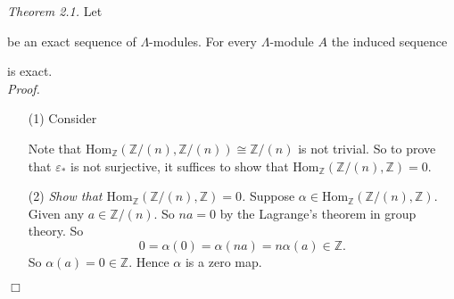 \documentclass{article}
\begin{document}
\emph{Theorem 2.1.}
Let
be an exact sequence of $\Lambda$-modules.
For every $\Lambda$-module $A$ the induced sequence
\begin{center}
\end{center}
is exact. \\



\emph{Proof.}
\begin{enumerate}
\item[(1)]
  Consider
  \begin{center}
  \end{center}
  Note that
  $\mathrm{Hom}_{\mathbb{Z}}(\mathbb{Z}/(n),\mathbb{Z}/(n)) \cong \mathbb{Z}/(n)$ is not trivial.
  So to prove that $\varepsilon_{*}$ is not surjective,
  it suffices to show that $\mathrm{Hom}_{\mathbb{Z}}(\mathbb{Z}/(n),\mathbb{Z}) = 0$.

\item[(2)]
  \emph{Show that $\mathrm{Hom}_{\mathbb{Z}}(\mathbb{Z}/(n),\mathbb{Z}) = 0$.}
  Suppose $\alpha \in \mathrm{Hom}_{\mathbb{Z}}(\mathbb{Z}/(n),\mathbb{Z})$.
  Given any $a \in \mathbb{Z}/(n)$.
  So $na = 0$ by the Lagrange's theorem in group theory.
  So
  \[
    0 = \alpha(0) = \alpha(na) = n \alpha(a) \in \mathbb{Z}.
  \]
  So $\alpha(a) = 0 \in \mathbb{Z}$.
  Hence $\alpha$ is a zero map.
\end{enumerate}
$\Box$ \\\\



\end{document}
